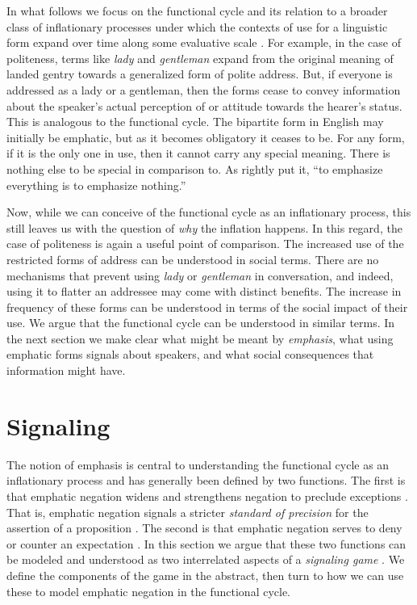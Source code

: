 \documentclass[linguex]{sp}
\theoremstyle{definition} \newtheorem{definition}{Definition}
\begin{document}
In what follows we focus on the functional cycle and its relation to a broader class of inflationary processes under which the contexts of use for a linguistic form expand over time along some evaluative scale \citep{dahl:2001}. For example, in the case of politeness, terms like \emph{lady} and \emph{gentleman} expand from the original meaning of landed gentry towards a generalized form of polite address. But, if everyone is addressed as a lady or a gentleman, then the forms cease to convey information about the speaker's actual perception of or attitude towards the hearer's status. This is  analogous to the functional cycle. The bipartite form in English may initially be emphatic, but as it becomes obligatory it ceases to be. For any form, if it is the only one in use, then it cannot carry any special meaning. There is nothing else to be special in comparison to. As \citet[5]{kiparsky-condoravdi:2006} rightly put it, ``to emphasize everything is to emphasize nothing.'' 

Now, while we can conceive of the functional cycle as an inflationary process, this still leaves us with the question of \emph{why} the inflation happens. In this regard, the case of politeness is again a useful point of comparison. The increased use of the restricted forms of address can be understood in social terms. There are no mechanisms that prevent using \emph{lady} or \emph{gentleman} in conversation, and indeed, using it to flatter an addressee may come with distinct benefits. The increase in frequency of these forms can be understood in terms of the social impact of their use. We argue that the functional cycle can be understood in similar terms. In the next section we make clear what might be meant by \emph{emphasis}, what using emphatic forms signals about speakers, and what social consequences that information might have.


\section{Signaling}
\label{Signaling}

The notion of emphasis is central to understanding the functional cycle as an inflationary process and has generally been defined by two functions. The first is that emphatic negation widens and strengthens negation to preclude exceptions  \citep{kadmon-landman1993any}.  That is, emphatic negation signals a stricter \emph{standard of precision} for the assertion of a proposition \citep{krifka1995polarity}. The second is that emphatic negation serves to deny or counter an expectation \citep{detges-waltereit2002, kiparsky-condoravdi:2006}. In this section we argue that these two functions can be modeled and understood as two interrelated aspects of a \emph{signaling game} \citep{lewis:1969}. We define the components of the game in the abstract, then turn to how we can use these to model emphatic negation in the functional cycle.
\end{document}
